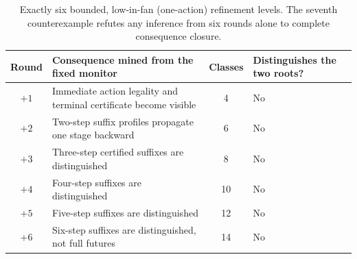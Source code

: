 \documentclass[11pt,letterpaper]{article}
\begin{document}
\begin{table}[htbp]\centering\small
\begin{tabularx}{\textwidth}{@{}cXcX@{}}\toprule
Round & Consequence mined from the fixed monitor & Classes & Distinguishes the two roots?\\\midrule
$+1$ & Immediate action legality and terminal certificate become visible &4& No\\
$+2$ & Two-step suffix profiles propagate one stage backward &6& No\\
$+3$ & Three-step certified suffixes are distinguished &8& No\\
$+4$ & Four-step suffixes are distinguished &10& No\\
$+5$ & Five-step suffixes are distinguished &12& No\\
$+6$ & Six-step suffixes are distinguished, not full futures &14& No\\\bottomrule
\end{tabularx}
\caption{Exactly six bounded, low-in-fan (one-action) refinement levels. The seventh counterexample refutes any inference from six rounds alone to complete consequence closure.}\label{tab:six}
\end{table}
\end{document}
